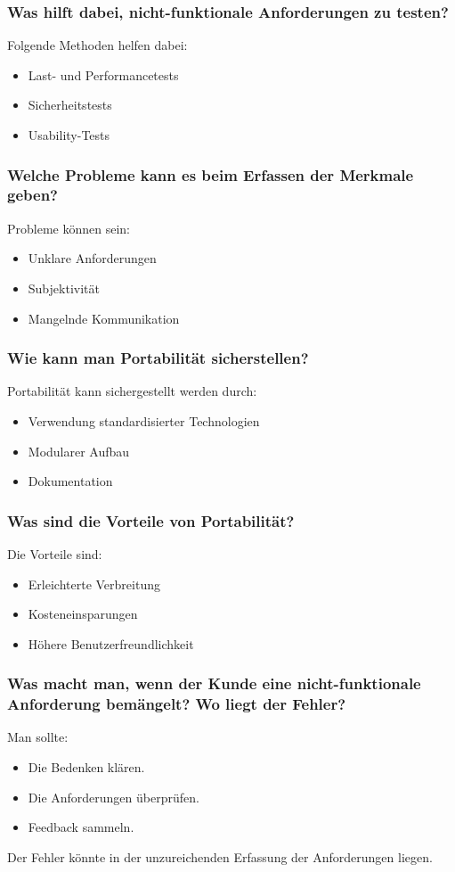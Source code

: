 \documentclass[main.tex]{subfiles}
\begin{document}
\subsubsection*{Was hilft dabei, nicht-funktionale Anforderungen zu testen?}
Folgende Methoden helfen dabei:
\begin{itemize}
    \item Last- und Performancetests
    \item Sicherheitstests
    \item Usability-Tests
\end{itemize}


\subsubsection*{Welche Probleme kann es beim Erfassen der Merkmale geben?}
Probleme können sein:
\begin{itemize}
    \item Unklare Anforderungen
    \item Subjektivität
    \item Mangelnde Kommunikation
\end{itemize}


\subsubsection*{Wie kann man \gls{Portabilität} sicherstellen?}
\gls{Portabilität} kann sichergestellt werden durch:
\begin{itemize}
    \item Verwendung standardisierter Technologien
    \item Modularer Aufbau
    \item Dokumentation
\end{itemize}


\subsubsection*{Was sind die Vorteile von \gls{Portabilität}?}
Die Vorteile sind:
\begin{itemize}
    \item Erleichterte Verbreitung
    \item Kosteneinsparungen
    \item Höhere Benutzerfreundlichkeit
\end{itemize}


\subsubsection*{Was macht man, wenn der Kunde eine nicht-funktionale Anforderung bemängelt? Wo liegt der Fehler?} %
Man sollte:
\begin{itemize}
    \item Die Bedenken klären.
    \item Die Anforderungen überprüfen.
    \item Feedback sammeln.
\end{itemize}
Der Fehler könnte in der unzureichenden Erfassung der Anforderungen liegen.
\end{document}
